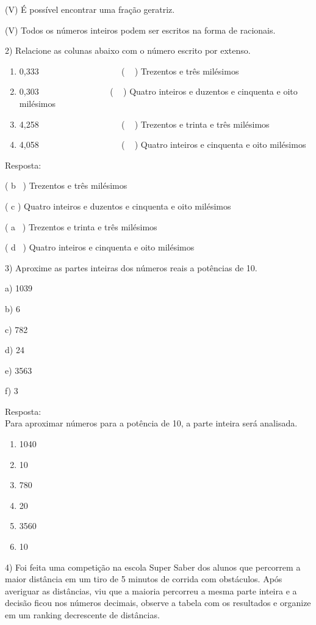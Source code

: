 {(V) É possível encontrar uma fração geratriz.

(V) Todos os números inteiros podem ser escritos na forma de racionais.

2) Relacione as colunas abaixo com o número escrito por extenso.

\begin{enumerate}
\def\labelenumi{\alph{enumi})}
\item
  0,333~ ~ ~ ~ ~ ~ ~ ~ ~ ~ ~ ~( ~ ) Trezentos e três milésimos~
\item
  0,303~ ~ ~ ~ ~ ~ ~ ~ ~ ~ ( ~ ) Quatro inteiros e duzentos e cinquenta
  e oito milésimos
\item
  4,258~ ~ ~ ~ ~ ~ ~ ~ ~ ~ ~ ~( ~ ) Trezentos e trinta e três milésimos
\item
  4,058~ ~ ~ ~ ~ ~ ~ ~ ~ ~ ~ ~( ~ ) Quatro inteiros e cinquenta e oito
  milésimos
\end{enumerate}

Resposta:

( b~ ) Trezentos e três milésimos~

( c ) Quatro inteiros e duzentos e cinquenta e oito milésimos

( a~ ) Trezentos e trinta e três milésimos

( d~ ) Quatro inteiros e cinquenta e oito milésimos

3) Aproxime as partes inteiras dos números reais a potências de 10.

a) 1039

b) 6

c) 782

d) 24

e) 3563

f) 3

Resposta:\\
Para aproximar números para a potência de 10, a parte inteira será
analisada.

\begin{enumerate}
\def\labelenumi{\alph{enumi})}
\item
  1040
\item
  10
\item
  780
\item
  20
\item
  3560
\item
  10
\end{enumerate}

4) Foi feita uma competição na escola Super Saber dos alunos que
percorrem a maior distância em um tiro de 5 minutos de corrida com
obstáculos. Após averiguar as distâncias, viu que a maioria percorreu a
mesma parte inteira e a decisão ficou nos números decimais, observe a
tabela com os resultados e organize em um ranking decrescente de
distâncias.~

}
